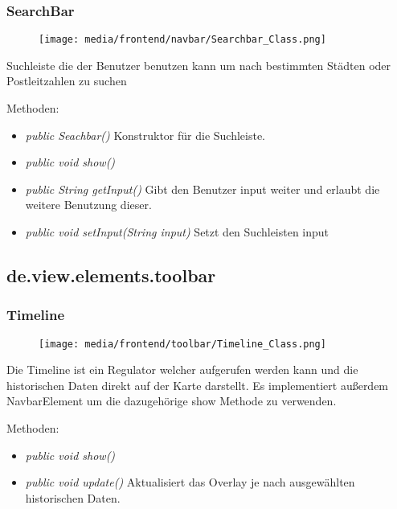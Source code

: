\subsubsection{SearchBar}
\begin{minipage}{0.3\textwidth}
    \begin{figure}[H]
        \texttt{[image: media/frontend/navbar/Searchbar\_Class.png]}
    \end{figure}
    \end{minipage} \hfill
    \begin{minipage}{0.6\textwidth}
Suchleiste die der Benutzer benutzen kann um nach bestimmten Städten oder Postleitzahlen zu suchen
\end{minipage}

Methoden:
\begin{itemize} 
    \item \emph{public Seachbar()} Konstruktor für die Suchleiste.
    \item \emph{public void show()} 
    \item \emph{public String getInput()} Gibt den Benutzer input weiter und erlaubt die weitere Benutzung dieser.
    \item \emph{public void setInput(String input)} Setzt den Suchleisten input
\end{itemize}

\subsection{de.view.elements.toolbar}

\subsubsection{Timeline}
\begin{minipage}{0.3\textwidth}
    \begin{figure}[H]
        \texttt{[image: media/frontend/toolbar/Timeline\_Class.png]}
    \end{figure}
    \end{minipage} \hfill
    \begin{minipage}{0.6\textwidth}
Die Timeline ist ein Regulator welcher aufgerufen werden kann und die historischen Daten direkt auf der Karte darstellt. Es implementiert außerdem NavbarElement um die dazugehörige show Methode zu verwenden.
\end{minipage}

Methoden:
\begin{itemize} 
    \item \emph{public void show()}
    \item \emph{public void update()} Aktualisiert das Overlay je nach ausgewählten historischen Daten.
\end{itemize}


